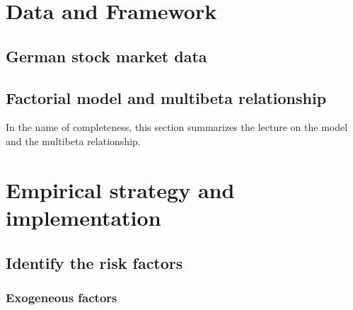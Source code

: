\documentclass[hidelinks,11pts]{article}
\DeclareMathOperator{\1}{\mathbbm{1}}
\begin{document}
\begin{comment}
\emph{factors} of aggregate risk is compensated by $k$ 
of the risk premium by identifying the compensation of $k$ different 


Unlike the CAPM model that considers a unique risk premium, the factorial model considers that investors holding risk in their portfolios\footnote{We assume that said portfolios are sufficiently large so that any source of idiosyncratic risk can be diversified so that only aggregate risk is remunerated.} by holding a stock $j$, are compensated with $k$ different risk premia associated to $k$ common factors.%

\end{comment}





\section{Data and Framework} 

    \subsection{German stock market data} \label{sec:model}



    \subsection{Factorial model and multibeta relationship}

In the name of completeness, this section summarizes the lecture on the \cite{rossArbitrageTheoryCapital1976} model and the multibeta relationship. 



\section{Empirical strategy and implementation}

    \subsection{Identify the risk factors}

        \subsubsection{Exogeneous factors}
\end{document}
